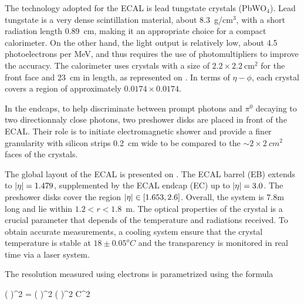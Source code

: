         The technology adopted for the ECAL is lead tungstate crystals (PbWO$_4$). Lead
        tungstate is a very dense scintillation material, about 8.3~g/cm$^3$, with a short
        radiation length 0.89~cm, making it an appropriate choice for a compact calorimeter.
        On the other hand, the light output is relatively low, about 4.5 photoelectrons
        per MeV, and thus requires the use of photomultipliers to improve the accuracy.
        The calorimeter uses crystals with a size of $2.2\times2.2~\text{cm}^2$
        for the front face and 23~cm in length, as represented on .
        In terms of $\eta-\phi$, each crystal covers a region of approximately $0.0174
        \times 0.0174$.


        In the endcaps, to help discriminate between prompt photons and $\pi^0$ decaying
        to two directionnaly close photons, two preshower disks are placed in front of the
        ECAL. Their role is to initiate electromagnetic shower and provide a finer granularity
        with silicon strips 0.2~cm wide to be compared to the $\sim2\times2~cm^2$ faces
        of the crystals.


        The global layout of the ECAL is presented on . The ECAL
        barrel (EB) extends to $\left| \eta \right| = 1.479$, supplemented by the ECAL endcap (EC)
        up to $\left| \eta \right| = 3.0$. The preshower disks cover the region $\left| \eta \right| \in [1.653,2.6]$.
        Overall, the system is 7.8m long and lie within $1.2 < r < 1.8$~m.
        The optical properties of the crystal is a crucial parameter that depends of the
        temperature and radiations received. To obtain accurate measurements, a cooling
        system ensure that the crystal temperature is stable at $18\pm0.05^oC$ and the
        transparency is monitored in real time via a laser system.

        The resolution measured using electrons is parametrized using the formula

        {
            \left(  \right)^2
            =
            \left(  \right)^2
            \oplus
            \left(  \right)^2
            \oplus
            C^2
        }

